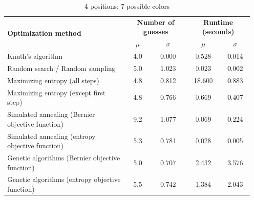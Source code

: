 \documentclass[11pt]{article}
\begin{document}
\begin{table}[h!]
\begin{center}
\begin{tabular}{l c c c c}
\toprule
\multirow{2}{*}{\bfseries Optimization method} 		& \multicolumn{2}{c}{\bfseries Number of guesses} 		& \multicolumn{2}{c}{\bfseries Runtime (seconds)}	\\
\cmidrule(lr){2-3}  \cmidrule(lr){4-5}				& $\mu$ & $\sigma$								& $\mu$ & $\sigma$							\\
\cmidrule(lr){1-5}
Knuth's algorithm							& 4.0 & 0.000									& 0.528 & 0.014							\\
Random search / Random sampling				& 5.0 & 1.023									& 0.023 & 0.002							\\
Maximizing entropy (all steps)					& 4.8 & 0.812									& 18.600 & 0.883							\\
Maximizing entropy (except first step)			& 4.8 & 0.766									& 0.669 & 0.407							\\
Simulated annealing (Bernier objective function)	& 9.2 & 1.077									& 0.069 & 0.224							\\
Simulated annealing (entropy objective function)	& 5.3 & 0.781									& 0.028 & 0.005							\\
Genetic algorithms (Bernier objective function)		& 5.0 & 0.707									& 2.432 & 3.576							\\
Genetic algorithms (entropy objective function)		& 5.5 & 0.742									& 1.384 & 2.043							\\
\bottomrule
\end{tabular}
\end{center}
\caption{4 positions; 7 possible colors}
\label{fig:compare_4_7}
\end{table}

\newpage
\end{document}
